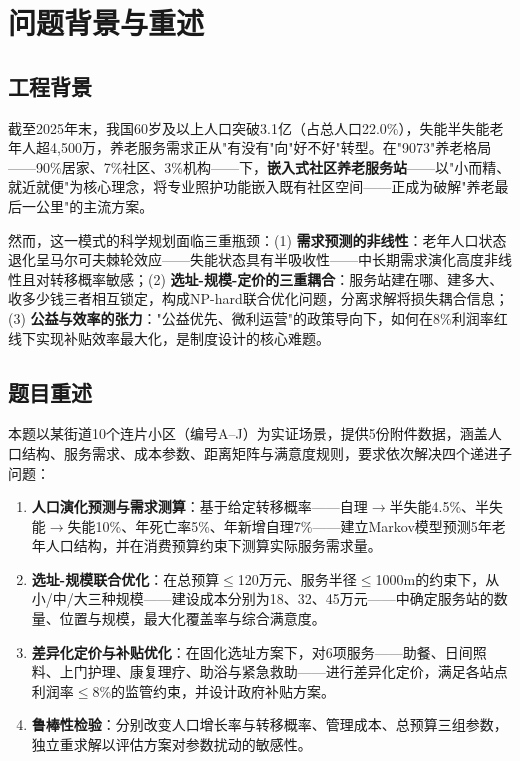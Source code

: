 
\section{问题背景与重述}

\subsection{工程背景}

截至2025年末，我国60岁及以上人口突破3.1亿（占总人口22.0\%），失能半失能老年人超4,500万，养老服务需求正从"有没有"向"好不好"转型。在"9073"养老格局——90\%居家、7\%社区、3\%机构——下，\textbf{嵌入式社区养老服务站}——以"小而精、就近就便"为核心理念，将专业照护功能嵌入既有社区空间——正成为破解"养老最后一公里"的主流方案。

然而，这一模式的科学规划面临三重瓶颈：(1) \textbf{需求预测的非线性}：老年人口状态退化呈马尔可夫棘轮效应——失能状态具有半吸收性——中长期需求演化高度非线性且对转移概率敏感；(2) \textbf{选址-规模-定价的三重耦合}：服务站建在哪、建多大、收多少钱三者相互锁定，构成NP-hard联合优化问题，分离求解将损失耦合信息；(3) \textbf{公益与效率的张力}："公益优先、微利运营"的政策导向下，如何在8\%利润率红线下实现补贴效率最大化，是制度设计的核心难题。

\subsection{题目重述}

本题以某街道10个连片小区（编号A--J）为实证场景，提供5份附件数据，涵盖人口结构、服务需求、成本参数、距离矩阵与满意度规则，要求依次解决四个递进子问题：

\begin{enumerate}[label=\textbf{(\arabic*)}, leftmargin=*, itemsep=2pt]
    \item \textbf{人口演化预测与需求测算}：基于给定转移概率——自理$\to$半失能4.5\%、半失能$\to$失能10\%、年死亡率5\%、年新增自理7\%——建立Markov模型预测5年老年人口结构，并在消费预算约束下测算实际服务需求量。
    \item \textbf{选址-规模联合优化}：在总预算$\le$120万元、服务半径$\le$1000m的约束下，从小/中/大三种规模——建设成本分别为18、32、45万元——中确定服务站的数量、位置与规模，最大化覆盖率与综合满意度。
    \item \textbf{差异化定价与补贴优化}：在固化选址方案下，对6项服务——助餐、日间照料、上门护理、康复理疗、助浴与紧急救助——进行差异化定价，满足各站点利润率$\le$8\%的监管约束，并设计政府补贴方案。
    \item \textbf{鲁棒性检验}：分别改变人口增长率与转移概率、管理成本、总预算三组参数，独立重求解以评估方案对参数扰动的敏感性。
\end{enumerate}

